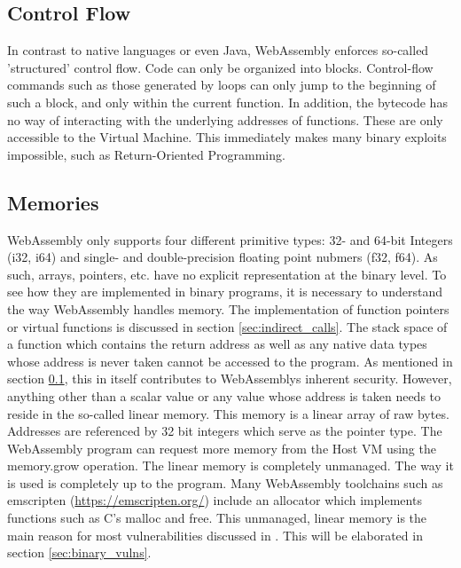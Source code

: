 \documentclass[sigconf]{acmart}
\begin{document}
\subsection{Control Flow}
\label{sec:wasm_control_flow}
In contrast to native languages or even Java, WebAssembly enforces so-called 'structured' control flow. Code can only be organized into blocks. Control-flow commands such as those generated by loops can only jump to the beginning of such a block, and only within the current function. In addition, the bytecode has no way of interacting with the underlying addresses of functions. These are only accessible to the Virtual Machine. This immediately makes many binary exploits impossible, such as Return-Oriented Programming. 

\subsection{Memories} 
\label{sec:memories}
WebAssembly only supports four different primitive types: 32- and 64-bit Integers (i32, i64) and single- and double-precision floating point nubmers (f32, f64). As such, arrays, pointers, etc. have no explicit representation at the binary level. To see how they are implemented in binary programs, it is necessary to understand the way WebAssembly handles memory. The implementation of function pointers or virtual functions is discussed in section \ref{sec:indirect_calls}. The stack space of a function which contains the return address as well as any native data types whose address is never taken cannot be accessed to the program. As mentioned in section \ref{sec:wasm_control_flow}, this in itself contributes to WebAssemblys inherent security. However, anything other than a scalar value or any value whose address is taken needs to reside in the so-called linear memory. This memory is a linear array of raw bytes. Addresses are referenced by 32 bit integers which serve as the pointer type. The WebAssembly program can request more memory from the Host VM using the memory.grow operation. The linear memory is completely unmanaged. The way it is used is completely up to the program. Many WebAssembly toolchains such as emscripten (\url{https://emscripten.org/}) include an allocator which implements functions such as C's malloc and free. This unmanaged, linear memory is the main reason for most vulnerabilities discussed in \cite{lehmann_everything_2020}. This will be elaborated in section \ref{sec:binary_vulns}.
\end{document}
